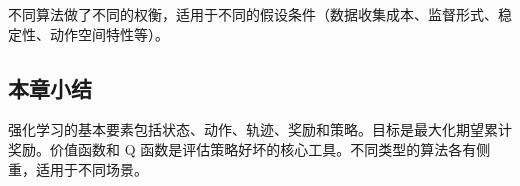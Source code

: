 不同算法做了不同的权衡，适用于不同的假设条件（数据收集成本、监督形式、稳定性、动作空间特性等）。

\subsection{本章小结}

强化学习的基本要素包括状态、动作、轨迹、奖励和策略。目标是最大化期望累计奖励。价值函数和 Q 函数是评估策略好坏的核心工具。不同类型的算法各有侧重，适用于不同场景。

